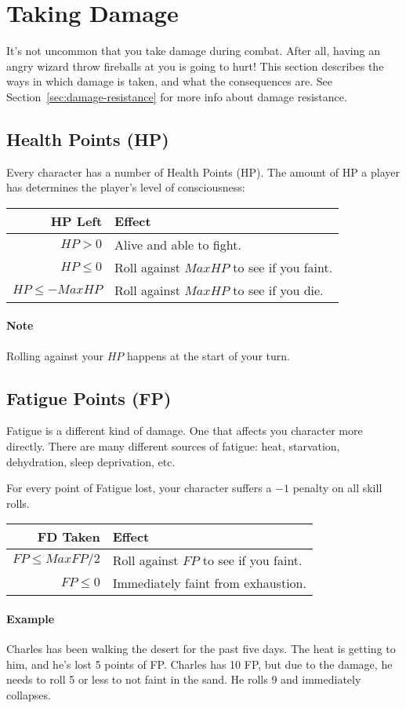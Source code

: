 \section{Taking Damage}
It's not uncommon that you take damage during combat.
After all, having an angry wizard throw fireballs at you is going to hurt!
This section describes the ways in which damage is taken, and what the consequences are.
See Section~\ref{sec:damage-resistance} for more info about damage resistance.

\subsection{Health Points (HP)}\label{sec:health-points}
Every character has a number of Health Points (HP).
The amount of HP a player has determines the player's level of consciousness:

\begin{center}
  \begin{tabular}{r | l}
    \textbf{HP Left} & \textbf{Effect} \\\hline
    $HP > 0$         & Alive and able to fight. \\
    $HP \leq 0$      & Roll against $MaxHP$ to see if you faint. \\
    $HP \leq -MaxHP$ & Roll against $MaxHP$ to see if you die.
  \end{tabular}
\end{center}

\paragraph{Note} Rolling against your $HP$ happens at the start of your turn.
  
\subsection{Fatigue Points (FP)}\label{sec:fatigue-points}
Fatigue is a different kind of damage.
One that affects you character more directly.
There are many different sources of fatigue: heat, starvation, dehydration, sleep deprivation, etc.

For every point of Fatigue lost, your character suffers a $-1$ penalty on all skill rolls.

\begin{center}
  \begin{tabular}{r | l}
    \textbf{FD Taken} & \textbf{Effect} \\\hline
    $FP \leq MaxFP/2$ & Roll against $FP$ to see if you faint. \\
    $FP \leq 0$   & Immediately faint from exhaustion.
  \end{tabular}
\end{center}

\paragraph{Example} Charles has been walking the desert for the past five days.
The heat is getting to him, and he's lost 5 points of FP.
Charles has 10 FP, but due to the damage, he needs to roll 5 or less to not faint in the sand.
He rolls 9 and immediately collapses.